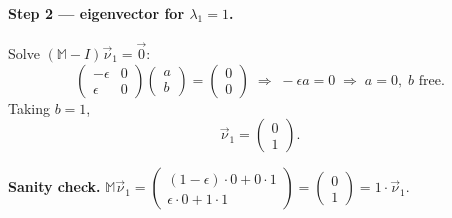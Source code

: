 \documentclass[12pt,a4paper]{article}
\newcommand{\M}{\mathbb{M}}
\newcommand{\vnu}{\vec{\nu}}
\begin{document}
\paragraph{Step 2 --- eigenvector for $\lambda_1 = 1$.} Solve $(\M - I)\vnu_1 = \vec{0}$:
\[
\begin{pmatrix} -\epsilon & 0 \\ \epsilon & 0 \end{pmatrix}\begin{pmatrix} a\\b \end{pmatrix} = \begin{pmatrix} 0\\0 \end{pmatrix}
\;\Longrightarrow\; -\epsilon a = 0 \;\Rightarrow\; a = 0,\; b \text{ free}.
\]
Taking $b=1$,
\[
\boxed{\vnu_1 = \begin{pmatrix} 0 \\ 1 \end{pmatrix}.}
\]
\begin{sanity}
\textbf{Sanity check.} $\M\vnu_1 = \begin{pmatrix} (1-\epsilon)\cdot 0 + 0\cdot 1 \\ \epsilon\cdot 0 + 1\cdot 1\end{pmatrix} = \begin{pmatrix} 0\\1\end{pmatrix} = 1\cdot\vnu_1$. \checkmark
\end{sanity}
\end{document}
